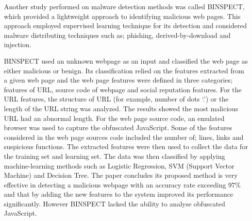 Another study performed on malware detection methods was called BINSPECT, which
provided a lightweight approach to identifying malicious web pages. This
approach employed supervised learning technique for its detection and
considered malware distributing techniques such as; phishing,
derived-by-download and injection\cite{eshete2012binspect}.

BINSPECT used an unknown webpage as an input and classified the web page as
either malicious or benign. Its classification relied on the features extracted
from a given web page and the web page features were defined in three
categories; features of URL, source code of webpage and social reputation
features.  For the URL features, the structure of URL (for example, number of
dots ‘.’) or the length of the URL string was analyzed. The results showed the
most malicious URL had an abnormal length. For the web page source code, an
emulated browser was used to capture the obfuscated JavaScript. Some of the
features considered in the web page sources code included the number of; lines,
links and suspicious functions. The extracted features were then used to
collect the data for the training set and learning set. The data was then
classified by applying machine-learning methods such as Logistic Regression,
SVM (Support Vector Machine) and Decision Tree\cite{eshete2012binspect}.  The
paper concludes its proposed method is very effective in detecting a malicious
webpage with an accuracy rate exceeding 97\% and that by adding the new
features to the system improved its performance significantly. However
BINSPECT lacked the ability to analyse obfuscated
JavaScript\cite{eshete2012binspect}. 
